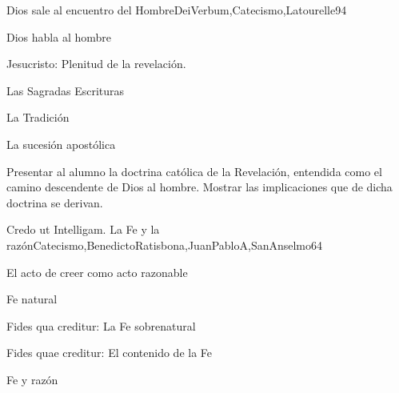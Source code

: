 \begin{syllabus}
\begin{unit}{Dios sale al encuentro del Hombre}{DeiVerbum,Catecismo,Latourelle}{9}{4}
\begin{topics}
      \item Dios habla al hombre
      \item Jesucristo: Plenitud de la revelación.
      \item Las Sagradas Escrituras
      \item La Tradición
      \item La sucesión apostólica
\end{topics}

\begin{unitgoals}
      \item Presentar al alumno la doctrina católica de la Revelación,  entendida como el camino descendente de Dios al hombre.
Mostrar las implicaciones que de dicha doctrina se derivan.
\end{unitgoals}
\end{unit}

\begin{unit}{Credo ut Intelligam. La Fe y la razón}{Catecismo,BenedictoRatisbona,JuanPabloA,SanAnselmo}{6}{4}
\begin{topics}
      \item El acto de creer como acto razonable
      \item Fe natural 
      \item Fides qua creditur: La Fe sobrenatural
      \item Fides quae creditur: El contenido de la Fe
      \item Fe y razón

\end{topics}

\begin{unitgoals}
      \item 
\end{unitgoals}
\end{unit}


\end{syllabus}
